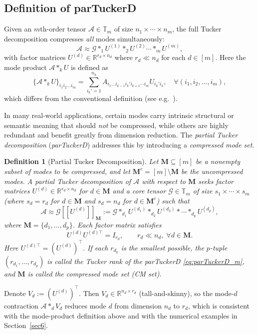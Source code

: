 \documentclass[11pt, oneside]{article}  %
\newtheorem{definition}[thm]{Definition}
\newcommand{\dsb}[1]{[\![#1]\!]}
\newcommand{\RR}{\mathbb{R}}
\newcommand{\TT}{\mathbb{T}}
\newcommand{\A}{\mathcal{A}}
\newcommand{\caG}{\mathcal{G}}
\newcommand{\caM}{\mathbf{M}}
\newcommand{\beq}{\begin{equation}}
\newcommand{\eeq}{\end{equation}}
\begin{document}
\subsection{Definition of parTuckerD}
\label{sec5-1}

Given an $m$th-order tensor $\A\in\TT_{m}$ of size $n_1\times\cdots\times n_m$, the full Tucker decomposition compresses \emph{all} modes simultaneously:
\[
\A\approx \caG\ast_1 U^{(1)} \ast_2 U^{(2)} \cdots \ast_m U^{(m)},
\]
with factor matrices $U^{(d)} \in \RR^{r_d \times n_d}$ where $r_{d}\ll n_{d}$ for each $d\in [m]$.  Here the mode product $\A\ast_{k} U$ is defined as
\[
\bigl\{\A\ast_{k} U\bigr\}_{i_1i_2\dots i_m}
= \sum_{i_k'=1}^{n_{k}} A_{i_1\dots i_{k-1}i_k'i_{k+1}\cdots i_m} U_{i_k' i_k}, \quad \forall (i_1, i_2, \ldots, i_m),
\]
which differs from the conventional definition (see e.g.\ \cite{Kolda2009}).

In many real-world applications, certain modes carry intrinsic structural or semantic meaning that should \emph{not} be compressed, while others are highly redundant and benefit greatly from dimension reduction.  The \emph{partial Tucker decomposition} (\emph{parTuckerD}) addresses this by introducing a \emph{compressed mode set}.

\begin{definition}[Partial Tucker Decomposition]
Let $\caM\subseteq[m]$ be a nonempty subset of modes to be compressed, and let $\caM^c=[m]\setminus\caM$ be the uncompressed modes.  A partial Tucker decomposition of $\A$ with respect to $\caM$ seeks factor matrices $U^{(d)}\in\RR^{r_d\times n_d}$ for $d\in\caM$ and a core tensor $\caG\in\TT_{m}$ of size $s_1\times\cdots\times s_m$ (where $s_d=r_d$ for $d\in\caM$ and $s_d=n_d$ for $d\in\caM^c$) such that
\beq\label{eq:parTuckerD_m}
\A \approx \caG\dsb{U^{(d)}}_{\caM}
:=\caG\ast_{d_1} U^{(d_1)}\ast_{d_2} U^{(d_2)}\ast\cdots\ast_{d_p} U^{(d_p)},
\eeq
where $\caM=\{d_1,\ldots,d_p\}$.  Each factor matrix satisfies
\beq\label{eq:Ud}
U^{(d)}U^{(d)\top} = I_{r_d}, \qquad r_d\ll n_d,\;\forall d\in\caM.
\eeq
Here $U^{(d)\top} = \left(U^{(d)}\right)^{\top}$.  If each $r_{d_k}$ is the smallest possible, the $p$-tuple $(r_{d_1},\ldots,r_{d_p})$ is called the \emph{Tucker rank} of the parTuckerD \eqref{eq:parTuckerD_m}, and $\caM$ is called the \emph{compressed mode set} (CM set).
\end{definition}

Denote $V_{d}:=\left(U^{(d)}\right)^{\top}$. Then $V_{d}\in\RR^{n_d\times r_d}$ (tall-and-skinny), so the mode-$d$ contraction 
$\A\ast_d V_{d}$ reduces mode $d$ from dimension $n_d$ to $r_d$, which is consistent with the mode-product definition above and with 
the numerical examples in Section~\ref{sec6}.
\end{document}
